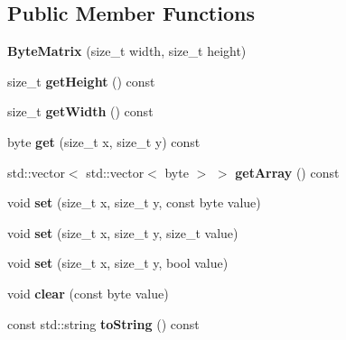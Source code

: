 \subsection*{Public Member Functions}
\begin{DoxyCompactItemize}
\item 
\mbox{\label{classzxing_1_1qrcode_1_1_byte_matrix_a6ab1ac3ef33283bc04f0e73289fc37fb}} 
{\bfseries Byte\+Matrix} (size\+\_\+t width, size\+\_\+t height)
\item 
\mbox{\label{classzxing_1_1qrcode_1_1_byte_matrix_a189598a499542dd20ef662acc0dea7cf}} 
size\+\_\+t {\bfseries get\+Height} () const
\item 
\mbox{\label{classzxing_1_1qrcode_1_1_byte_matrix_a1aa227314a0eb663d4fe821adb816761}} 
size\+\_\+t {\bfseries get\+Width} () const
\item 
\mbox{\label{classzxing_1_1qrcode_1_1_byte_matrix_a2f17b213378c57014b6970205bf7fb58}} 
byte {\bfseries get} (size\+\_\+t x, size\+\_\+t y) const
\item 
\mbox{\label{classzxing_1_1qrcode_1_1_byte_matrix_a5a9f95e14c3b2bde24263b2c29e855b8}} 
std\+::vector$<$ std\+::vector$<$ byte $>$ $>$ {\bfseries get\+Array} () const
\item 
\mbox{\label{classzxing_1_1qrcode_1_1_byte_matrix_a82c6a93de982cb11e09bf45081f8e485}} 
void {\bfseries set} (size\+\_\+t x, size\+\_\+t y, const byte value)
\item 
\mbox{\label{classzxing_1_1qrcode_1_1_byte_matrix_a47c76d4146396e75aff9e1b2c7c9eb41}} 
void {\bfseries set} (size\+\_\+t x, size\+\_\+t y, size\+\_\+t value)
\item 
\mbox{\label{classzxing_1_1qrcode_1_1_byte_matrix_a5ce9de597e235a3d9eb0fa8fd7175e5e}} 
void {\bfseries set} (size\+\_\+t x, size\+\_\+t y, bool value)
\item 
\mbox{\label{classzxing_1_1qrcode_1_1_byte_matrix_a7b1a962b016bc962943b12d1e671b68c}} 
void {\bfseries clear} (const byte value)
\item 
\mbox{\label{classzxing_1_1qrcode_1_1_byte_matrix_a8b7cd3a6bce6851e7060fee07250fa54}} 
const std\+::string {\bfseries to\+String} () const
\end{DoxyCompactItemize}


